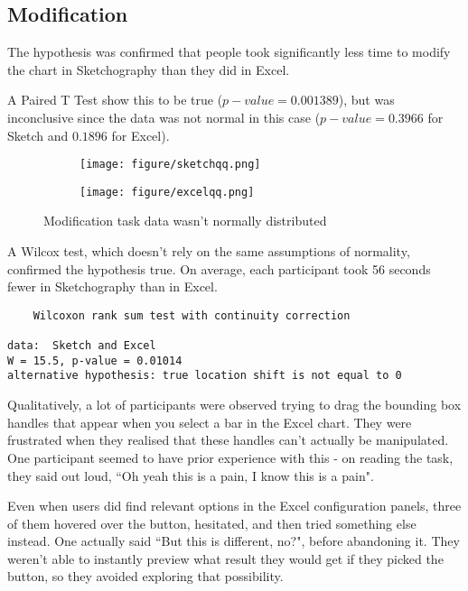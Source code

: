 \subsection{Modification}
The hypothesis was confirmed that people took significantly less time to modify the chart in Sketchography than they did in Excel.

A Paired T Test show this to be true ($p-value = 0.001389$), but was inconclusive since the data was not normal in this case ($p-value = 0.3966$ for Sketch and $0.1896$ for Excel). 

\begin{figure}[H]
		\centering
		\begin{subfigure}[b]{0.4\textwidth}
			\texttt{[image: figure/sketchqq.png]}
		\end{subfigure}
		\begin{subfigure}[b]{0.4\textwidth}
			\texttt{[image: figure/excelqq.png]}
		\end{subfigure}
		\caption{Modification task data wasn't normally distributed}
	\end{figure}

A Wilcox test, which doesn't rely on the same assumptions of normality, confirmed the hypothesis true. On average, each participant took 56 seconds fewer in Sketchography than in Excel.

\begin{verbatim}
	Wilcoxon rank sum test with continuity correction

data:  Sketch and Excel
W = 15.5, p-value = 0.01014
alternative hypothesis: true location shift is not equal to 0
\end{verbatim}

Qualitatively, a lot of participants were observed trying to drag the bounding box handles that appear when you select a bar in the Excel chart. They were frustrated when they realised that these handles can't actually be manipulated. One participant seemed to have prior experience with this - on reading the task, they said out loud, ``Oh yeah this is a pain, I know this is a pain".

Even when users did find relevant options in the Excel configuration panels, three of them hovered over the button, hesitated, and then tried something else instead. One actually said ``But this is different, no?", before abandoning it. They weren't able to instantly preview what result they would get if they picked the button, so they avoided exploring that possibility. 

